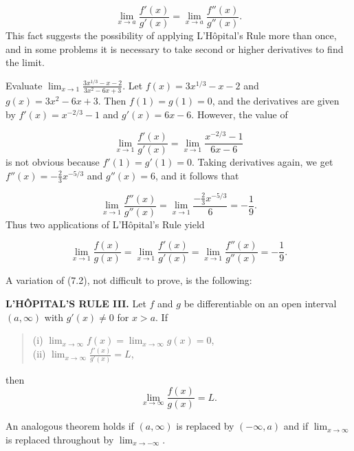 $$
\lim_{x \rightarrow a}\frac{f'(x)}{g'(x)} = \lim_{x \rightarrow a} \frac{f''(x)}{g''(x)}.
$$
This fact suggests the possibility of applying L'H\^{o}pital's Rule more than once, and in some problems it is necessary to take second or higher derivatives to find the limit.
\begin{example}
Evaluate $\lim_{x \rightarrow 1}\frac{ 3x^{1/3} - x - 2}{3x^2 - 6x + 3}$. Let $f(x) = 3x^{1/3} - x - 2$ and $g(x) = 3x^2 - 6x + 3$. Then $f(1) = g(1) = 0$, and the derivatives are given by $f'(x) = x^{-2/3} - 1$ and $g'(x) = 6x - 6$. However, the value of

$$
\lim_{x \rightarrow 1} \frac{f'(x)}{g'(x)} = \lim_{x \rightarrow 1}\frac{x^{-2/3} - 1}{6x - 6}
$$
\noindent is not obvious because $f'(1) = g'(1) = 0$. Taking derivatives again, we get $f''(x) = - \frac{2}{3}x^{-5/3}$ and $g''(x) = 6$, and it follows that

$$\lim_{x \rightarrow 1}\frac{f''(x)}{g''(x)} = \lim_{x \rightarrow 1}\frac{-\frac{2}{3} x^{-5/3}}{6} = -\frac{1}{9}.
$$ 
\noindent Thus two applications of L'H\^{o}pital's Rule yield 

$$\lim_{x \rightarrow 1}\frac{f(x)}{g(x)} = \lim_{x \rightarrow 1}\frac{f'(x)}{g'(x)}  = \lim_{x \rightarrow 1}\frac{f''(x)}{g''(x)} = -\frac{1}{9}.
$$
\end{example}
\medskip

A variation of (7.2), not difficult to prove, is the following:
 
\begin{theorem} %
\textbf{L'H\^{O}PITAL'S RULE III.}  Let $f$ and $g$ be differentiable on an open interval $(a, \infty)$ with $g'(x) \neq 0$ for $x > a$. If


\begin{quote}
\begin{description}
\item[(i) $\lim_{x \rightarrow \infty} f(x) = \lim_{x \rightarrow \infty} g(x) = 0$, ]
\item[(ii) $\lim_{x \rightarrow \infty}\frac{ f'(x)}{g'(x)} = L$,]
\end{description}
\end{quote} 

\noindent then 
$$
\lim_{x \rightarrow \infty} \frac{f(x)}{g(x)} = L.
$$

An analogous theorem holds if $(a, \infty)$ is replaced by $(-\infty, a)$ and if $\lim_{x \rightarrow \infty}$ is replaced throughout by $\lim_{x \rightarrow -\infty}$.
\end{theorem}

